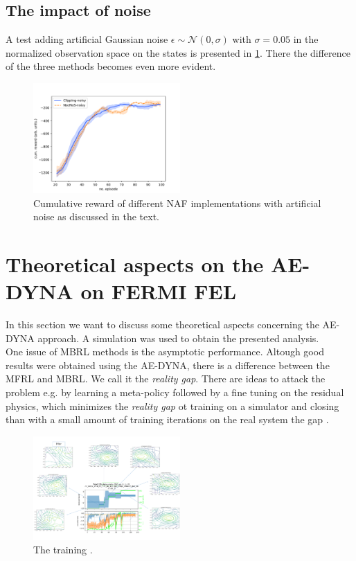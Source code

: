 \documentclass[
 reprint,
 amsmath,amssymb,amsfonts,clevref,
 aps,
prstab,
]{revtex4-2}
\begin{document}
\subsection{The impact of noise}
A test adding artificial Gaussian noise $\epsilon \sim \mathcal{N}(0, \sigma)$ with $\sigma=0.05$ in the normalized observation space on the states is presented in \cref{fig:comparsion_noise}. There the difference of the three methods becomes even more evident.

\begin{figure}[!h]
	\centering
	\includegraphics*[width=0.5\textwidth]{Figures/Comparison_noise}
	\caption{Cumulative reward of different NAF implementations with artificial noise as discussed in the text.}
	\label{fig:comparsion_noise}
\end{figure}

\section{Theoretical aspects on the AE-DYNA on FERMI FEL}
In this section we want to discuss some theoretical aspects concerning the AE-DYNA approach. A simulation was used to obtain the presented analysis. \\
One issue of MBRL methods is the asymptotic performance. Altough good results were obtained using the AE-DYNA, there is a difference between the MFRL and MBRL. We call it the \emph{reality gap}. There are ideas to attack the problem e.g. by learning a meta-policy \cite{Clavera2018} followed by a fine tuning on the residual physics, which minimizes the \emph{reality gap} ot training on a simulator and closing than with a small amount of training iterations on the real system the gap \cite{Zeng2019}.
\begin{figure}[!h]
	\centering
	\includegraphics*[width=0.5\textwidth]{Figures/Learning_evolution}
	\caption{The training .}
	\label{fig:Learning_evolution}
\end{figure}
\end{document}
